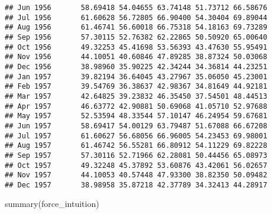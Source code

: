 \documentclass[
]{article}
\newenvironment{Shaded}{\begin{snugshade}}{\end{snugshade}}
\newcommand{\FunctionTok}[1]{\textcolor[rgb]{0.00,0.00,0.00}{#1}}
\newcommand{\NormalTok}[1]{#1}
\begin{document}
\begin{verbatim}
## Jun 1956       58.69418 54.04655 63.74148 51.73712 66.58676
## Jul 1956       61.60628 56.72805 66.90400 54.30404 69.89044
## Aug 1956       61.46741 56.60018 66.75318 54.18163 69.73289
## Sep 1956       57.30115 52.76382 62.22865 50.50920 65.00640
## Oct 1956       49.32253 45.41698 53.56393 43.47630 55.95491
## Nov 1956       44.10051 40.60846 47.89285 38.87324 50.03068
## Dec 1956       38.98960 35.90225 42.34244 34.36814 44.23251
## Jan 1957       39.82194 36.64045 43.27967 35.06050 45.23001
## Feb 1957       39.54769 36.38637 42.98367 34.81649 44.92181
## Mar 1957       42.64825 39.23832 46.35450 37.54501 48.44513
## Apr 1957       46.63772 42.90881 50.69068 41.05710 52.97688
## May 1957       52.53594 48.33544 57.10147 46.24954 59.67681
## Jun 1957       58.69417 54.00129 63.79487 51.67088 66.67208
## Jul 1957       61.60627 56.68056 66.96005 54.23453 69.98001
## Aug 1957       61.46742 56.55281 66.80912 54.11229 69.82228
## Sep 1957       57.30116 52.71966 62.28081 50.44456 65.08973
## Oct 1957       49.32248 45.37892 53.60876 43.42061 56.02657
## Nov 1957       44.10053 40.57448 47.93300 38.82350 50.09482
## Dec 1957       38.98958 35.87218 42.37789 34.32413 44.28917
\end{verbatim}

\begin{Shaded}
\begin{Highlighting}[]
\FunctionTok{summary}\NormalTok{(force\_intuition)}
\end{Highlighting}
\end{Shaded}
\end{document}
